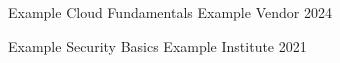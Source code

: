 

\begin{cvhonors}

  \cvhonor
    {Example Cloud Fundamentals} %
    {Example Vendor} %
    {} %
    {2024} %

  \cvhonor
    {Example Security Basics} %
    {Example Institute} %
    {} %
    {2021} %

\end{cvhonors}
